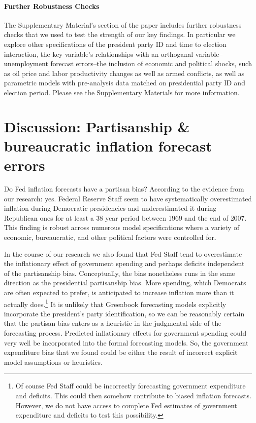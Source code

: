\documentclass[a4paper]{article}
\begin{document}
\paragraph{Further Robustness Checks}

The Supplementary Material's section of the paper includes further robustness checks that we used to test the strength of our key findings. In particular we explore other specifications of the president party ID and time to election interaction, the key variable's relationships with an orthoganal variable--unemployment forecast errors--the inclusion of economic and political shocks, such as oil price and labor productivity changes as well as armed conflicts, as well as parametric models with pre-analysis data matched on presidential party ID and election period. Please see the Supplementary Materials for more information. 

\section*{Discussion: Partisanship \& bureaucratic inflation forecast errors}

Do Fed inflation forecasts have a partisan bias? According to the evidence from our research: yes. Federal Reserve Staff seem to have systematically overestimated inflation during Democratic presidencies and underestimated it during Republican ones for at least a 38 year period between 1969 and the end of 2007. This finding is robust across numerous model specifications where a variety of economic, bureaucratic, and other political factors were controlled for. 

In the course of our research we also found that Fed Staff tend to overestimate the inflationary effect of government spending and perhaps deficits independent of the partisanship bias. Conceptually, the bias nonetheless runs in the same direction as the presidential partisanship bias. More spending, which Democrats are often expected to prefer, is anticipated to increase inflation more than it actually does.\footnote{Of course Fed Staff could be incorrectly forecasting government expenditure and deficits. This could then somehow contribute to biased inflation forecasts. However, we do not have access to complete Fed estimates of government expenditure and deficits to test this possibility.} It is unlikely that Greenbook forecasting models explicitly incorporate the president's party identification, so we can be reasonably certain that the partisan bias enters as a heuristic in the judgmental side of the forecasting process. Predicted inflationary effects for government spending could very well be incorporated into the formal forecasting models. So, the government expenditure bias that we found could be either the result of incorrect explicit model assumptions or heuristics.
\end{document}
